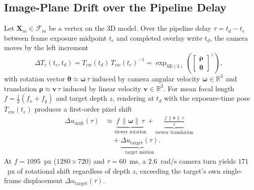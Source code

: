 \documentclass[journal]{IEEEtran}
\begin{document}
\subsection{Image-Plane Drift over the Pipeline Delay}
Let $\mathbf{X}_m \in \mathcal{F}_m$ be a vertex on the 3D model. Over the pipeline delay $\tau = t_d - t_e$ between frame exposure midpoint $t_e$ and completed overlay write $t_d$, the camera moves by the left increment
\begin{equation}
\Delta T_{c}(t_e, t_d) = T_{cw}(t_d)\,T_{cw}(t_e)^{-1} = \exp_{\mathrm{SE}(3)}\!\left(\begin{bmatrix}\boldsymbol{\rho}\\ \boldsymbol{\theta}\end{bmatrix}^\wedge\right),
\end{equation}
with rotation vector $\boldsymbol{\theta} \approx \boldsymbol{\omega}\,\tau$ induced by camera angular velocity $\boldsymbol{\omega} \in \mathbb{R}^3$ and translation $\boldsymbol{\rho} \approx \mathbf{v}\,\tau$ induced by linear velocity $\mathbf{v} \in \mathbb{R}^3$. For mean focal length $f = \frac{1}{2}(f_x+f_y)$ and target depth $z$, rendering at $t_d$ with the exposure-time pose $T_{cm}(t_e)$ produces a first-order pixel shift
\begin{align}
\Delta u_{\text{drift}}(\tau) &\approx \underbrace{f\,\|\boldsymbol{\omega}\|\,\tau}_{\text{viewer rotation}} + \underbrace{\frac{f\,\|\mathbf{v}\|\,\tau}{z}}_{\text{viewer translation}} \nonumber\\
&\quad + \underbrace{\Delta u_{\text{target}}(\tau)}_{\text{target motion}}.
\label{eq:drift}
\end{align}
At $f = 1095$~px ($1280\times720$) and $\tau = 60$~ms, a $2.6$~rad/s camera turn yields $171$~px of rotational shift regardless of depth $z$, exceeding the target's own single-frame displacement $\Delta u_{\text{target}}(\tau)$.
\end{document}
